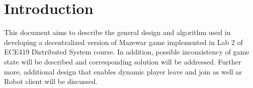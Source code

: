 \section{Introduction}\label{Intro}

This document aims to describe the general design and algorithm used in developing a decentralized version of Mazewar game implemented in Lab 2 of ECE419 Distributed System course. In addition, possible inconsistency of game state will be described and corresponding solution will be addressed. Further more, additional design that enables dynamic player leave and join as well as Robot client will be discussed.
